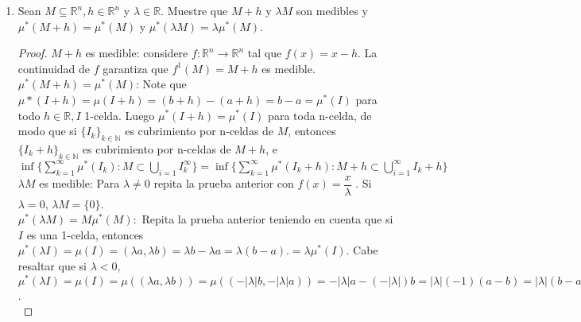 \documentclass[spanish,12pt,a4paper,openany]{book}
\begin{document}
\begin{enumerate}
			\item Sean $ M \subseteq \mathbb{R}^{n}, h \in \mathbb{R} ^{n}$ y $\lambda \in \mathbb{R}$. Muestre que $M + h $ y $ \lambda M$ son medibles y $\mu^{*}(M+h) = \mu^{*}(M)$ y $\mu^{*}(\lambda M) = \lambda \mu^{*}(M)$. 
			
				\begin{proof}
					$M + h$ es medible: considere $f: \mathbb{R}^{n} \rightarrow \mathbb{R}^{n}$ tal que $f(x) = x - h$. La continuidad de $f$ garantiza que $f ^{1} (M) = M + h$ es medible.\\
					
					$\mu^{*} (M + h) = \mu^{*} (M)$: Note que $\mu*(I + h) = \mu(I + h) = (b + h) - (a + h)  = b - a = \mu^{*}(I)$ para todo $h \in  \mathbb{R}, I $ 1-celda. Luego $\mu^{*}(I+h)  = \mu^{*}(I)$ para toda n-celda, de modo que si $\{ I_{k}\}_{k \in \mathbb{N}}$ es cubrimiento por n-celdas de $M$, entonces $\{I_{k} + h\}_{k \in \mathbb{N}}$ es cubrimiento por n-celdas de $M + h$, e $\inf \{ \sum_{k=1}^{\infty} \mu^{*} (I_{k}) : M \subset \bigcup_{i=1} I_{k}^{\infty}\} = \inf \{ \sum_{k=1}^{\infty} \mu^{*} (I_{k} + h) : M + h\subset \bigcup_{i=1}^{\infty} I_{k} + h \}$\\
					
					$\lambda M$ es medible: Para $\lambda \neq 0$ repita la prueba anterior con $f(x) = \dfrac{x}{\lambda}$ . Si $\lambda = 0$, $\lambda M = \{ 0 \}$.\\
					
					$\mu^{*}(\lambda M) = M \mu^{*} (M):$ Repita la prueba anterior teniendo en cuenta que si $I$ es una 1-celda, entonces $ \mu^{*}(\lambda I) = \mu(I) = (\lambda a , \lambda b) = \lambda b - \lambda a = \lambda(b-a). =  \lambda \mu^{*}(I)$. Cabe resaltar que si $\lambda < 0 $, $\mu^{*}(\lambda I) = \mu(I) = \mu((\lambda a , \lambda b)) = \mu((-|\lambda| b   , -|\lambda | a)) = -|\lambda| a  - (-|\lambda|) b = |\lambda|(-1)(a-b) = |\lambda|(b-a). =  |\lambda| \mu^{*}(I)$.\\
					

\end{proof}
\end{enumerate}
\end{document}
